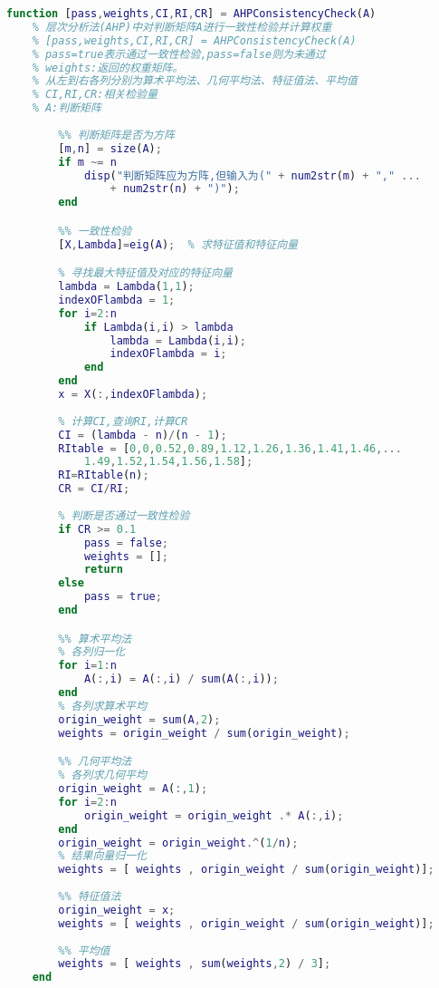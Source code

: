 \documentclass[withoutpreface]{cumcmthesis}
\begin{document}
    \begin{lstlisting}[language=matlab,caption={AHPConsistencyCheck.m}]
    function [pass,weights,CI,RI,CR] = AHPConsistencyCheck(A)
    % 层次分析法(AHP)中对判断矩阵A进行一致性检验并计算权重
    % [pass,weights,CI,RI,CR] = AHPConsistencyCheck(A)
    % pass=true表示通过一致性检验,pass=false则为未通过
    % weights:返回的权重矩阵。
    % 从左到右各列分别为算术平均法、几何平均法、特征值法、平均值
    % CI,RI,CR:相关检验量
    % A:判断矩阵
        
        %% 判断矩阵是否为方阵
        [m,n] = size(A); 
        if m ~= n
            disp("判断矩阵应为方阵,但输入为(" + num2str(m) + "," ...
                + num2str(n) + ")");
        end

        %% 一致性检验
        [X,Lambda]=eig(A);  % 求特征值和特征向量

        % 寻找最大特征值及对应的特征向量
        lambda = Lambda(1,1);
        indexOFlambda = 1;
        for i=2:n
            if Lambda(i,i) > lambda
                lambda = Lambda(i,i);
                indexOFlambda = i;
            end
        end
        x = X(:,indexOFlambda);
        
        % 计算CI,查询RI,计算CR
        CI = (lambda - n)/(n - 1);
        RItable = [0,0,0.52,0.89,1.12,1.26,1.36,1.41,1.46,...
            1.49,1.52,1.54,1.56,1.58];
        RI=RItable(n);
        CR = CI/RI;
        
        % 判断是否通过一致性检验
        if CR >= 0.1
            pass = false;
            weights = [];
            return 
        else
            pass = true;
        end

        %% 算术平均法
        % 各列归一化
        for i=1:n
            A(:,i) = A(:,i) / sum(A(:,i));
        end
        % 各列求算术平均
        origin_weight = sum(A,2);
        weights = origin_weight / sum(origin_weight);

        %% 几何平均法
        % 各列求几何平均
        origin_weight = A(:,1);
        for i=2:n
            origin_weight = origin_weight .* A(:,i);
        end
        origin_weight = origin_weight.^(1/n);
        % 结果向量归一化
        weights = [ weights , origin_weight / sum(origin_weight)];
        
        %% 特征值法
        origin_weight = x;
        weights = [ weights , origin_weight / sum(origin_weight)];
        
        %% 平均值
        weights = [ weights , sum(weights,2) / 3];
    end
    \end{lstlisting}
\end{document}
